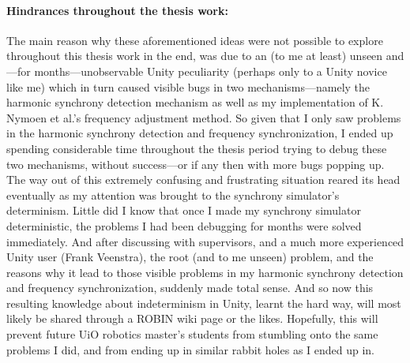 	\paragraph{Hindrances throughout the thesis work:}
	The main reason why these aforementioned ideas were not possible to explore throughout this thesis work in the end, was due to an (to me at least) unseen and—for months—unobservable Unity peculiarity (perhaps only to a Unity novice like me) which in turn caused visible bugs in two mechanisms—namely the harmonic synchrony detection mechanism as well as my implementation of K. Nymoen et al.'s frequency adjustment method. So given that I only saw problems in the harmonic synchrony detection and frequency synchronization, I ended up spending considerable time throughout the thesis period trying to debug these two mechanisms, without success—or if any then with more bugs popping up. The way out of this extremely confusing and frustrating situation reared its head eventually as my attention was brought to the synchrony simulator's determinism. Little did I know that once I made my synchrony simulator deterministic, the problems I had been debugging for months were solved immediately. And after discussing with supervisors, and a much more experienced Unity user (Frank Veenstra), the root (and to me unseen) problem, and the reasons why it lead to those visible problems in my harmonic synchrony detection and frequency synchronization, suddenly made total sense. And so now this resulting knowledge about indeterminism in Unity, learnt the hard way, will most likely be shared through a ROBIN wiki page or the likes. Hopefully, this will prevent future UiO robotics master's students from stumbling onto the same problems I did, and from ending up in similar rabbit holes as I ended up in.